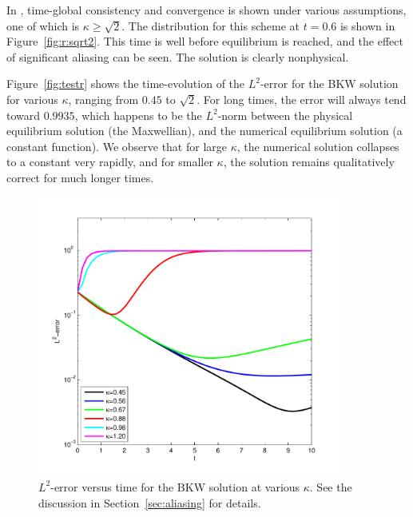 In \cite{Filbet2011asm}, time-global consistency and convergence is shown under
various assumptions, one of which is $\kappa\geq\sqrt{2}$. The distribution for
this scheme at $t=0.6$ is shown in Figure~\vref{fig:r:sqrt2}. This time is well
before equilibrium is reached, and the effect of significant aliasing can be
seen. The solution is clearly nonphysical.

Figure~\vref{fig:testr} shows the time-evolution of the $L^2$-error for the BKW
solution for various $\kappa$, ranging from $0.45$ to $\sqrt{2}$. For long
times, the error will always tend toward $0.9935$, which happens to be the
$L^2$-norm between the physical equilibrium solution (the Maxwellian), and the
numerical equilibrium solution (a constant function). We observe that for large
$\kappa$, the numerical solution collapses to a constant very rapidly, and for
smaller $\kappa$, the solution remains qualitatively correct for much longer
times.

\begin{figure}
    \centering
    \includegraphics[width=10cm]{figs/hcboltz/testr}
    \caption{$L^2$-error versus time for the BKW solution at various $\kappa$. See the discussion in
    Section~\vref{sec:aliasing} for details.}
    \label{fig:testr}
\end{figure}
